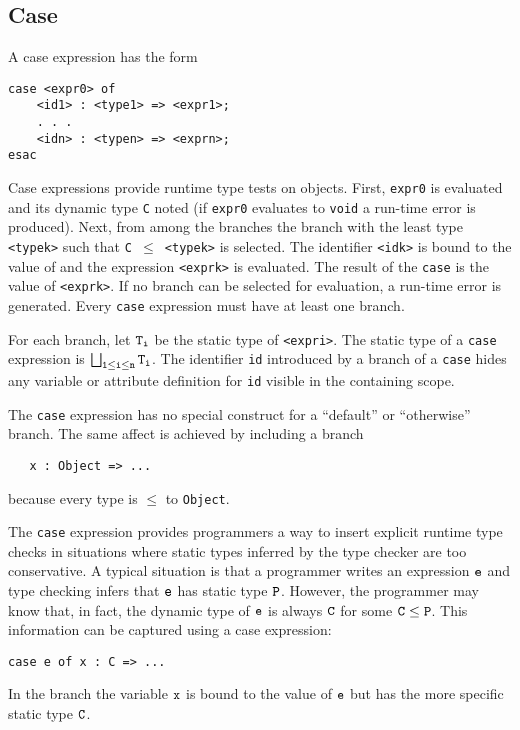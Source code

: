 \documentclass[11pt]{article}
\begin{document}
\subsection{Case}
A case expression has the form
\begin{verbatim}
case <expr0> of 
    <id1> : <type1> => <expr1>; 
    . . .
    <idn> : <typen> => <exprn>; 
esac
\end{verbatim}
Case expressions provide runtime type tests on objects. 
First, {\tt expr0} is evaluated and its dynamic type {\tt C} noted
(if {\tt expr0} evaluates to {\tt void} a run-time error is produced).
Next, from among the branches the branch with the least type
{\tt <typek>} such that {\tt C $\leq$ <typek>} is selected. The identifier
{\tt <idk>} is bound to the
value of {\tt <expr0>} and the expression {\tt <exprk>} is evaluated.
The result of the {\tt case} is the value of {\tt <exprk>}.
If no branch can be selected for evaluation, a run-time error is generated.
Every {\tt case} expression must have at least one branch.


For each branch, let $\tt T_i$ be the static type of {\tt <expri>}.
The static type of a {\tt case} expression is $\tt \bigsqcup_{1 \leq i \leq
n} T_i$.
The identifier {\tt id} introduced by a branch of a {\tt case} hides any 
variable or attribute definition for {\tt id} visible in the containing scope.

The {\tt case} expression has no special construct for a ``default'' or
``otherwise'' branch.  The same affect is achieved by including a branch
\begin{verbatim}
   x : Object => ...
\end{verbatim}
because every type is $\leq$ to {\tt Object}.

The {\tt case} expression provides programmers a way to insert explicit
runtime type checks in situations where static types inferred by
the type checker are too conservative.  A typical
situation is that a programmer writes an expression $\tt e$ and type
checking infers that $\tt e$ has static type $\tt P$.  However, the programmer
may know that, in fact, the dynamic type of $\tt e$ is always $\tt C$ for
some $\tt C \leq P$.  This information can be captured
using a case expression:
\begin{verbatim}
case e of x : C => ...
\end{verbatim}
In the branch the variable $\tt x$ is bound to the value of $\tt e$ but
has the more specific static type $\tt C$.
\end{document}
